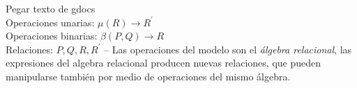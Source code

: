 Pegar texto de gdocs\\
Operaciones unarias: $\mu(R) \rightarrow R^\prime$\\
Operaciones binarias: $\beta(P,Q) \rightarrow R$\\
Relaciones: $P,Q,R,R^\prime$
--
Las operaciones del modelo son el \emph{álgebra relacional}, las expresiones del algebra relacional producen nuevas relaciones, que pueden manipularse también por medio de operaciones del mismo álgebra.